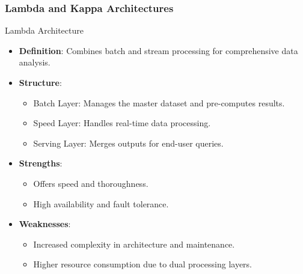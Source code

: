 \documentclass[aspectratio=169]{beamer}
\begin{document}
\begin{frame}[fragile]
    \frametitle{Lambda and Kappa Architectures}
    \begin{block}{Lambda Architecture}
        \begin{itemize}
            \item \textbf{Definition}: Combines batch and stream processing for comprehensive data analysis.
            \item \textbf{Structure}:
                \begin{itemize}
                    \item Batch Layer: Manages the master dataset and pre-computes results.
                    \item Speed Layer: Handles real-time data processing.
                    \item Serving Layer: Merges outputs for end-user queries.
                \end{itemize}
            \item \textbf{Strengths}:
                \begin{itemize}
                    \item Offers speed and thoroughness.
                    \item High availability and fault tolerance.
                \end{itemize}
            \item \textbf{Weaknesses}:
                \begin{itemize}
                    \item Increased complexity in architecture and maintenance.
                    \item Higher resource consumption due to dual processing layers.
                \end{itemize}
        \end{itemize}
    \end{block}
    

\end{frame}
\end{document}
